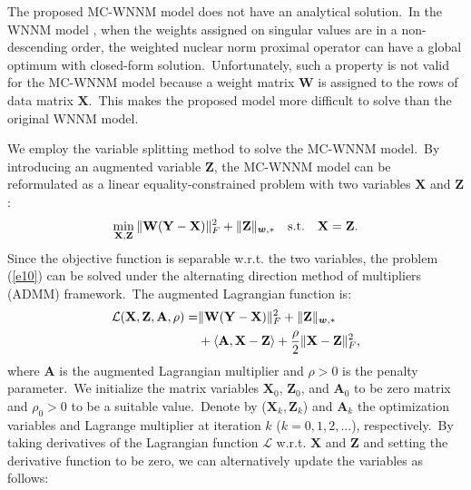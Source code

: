\documentclass[10pt,twocolumn,letterpaper]{article}
\begin{document}
The proposed MC-WNNM model does not have an analytical solution.\ In the WNNM model \cite{wnnmijcv}, when the weights assigned on singular values are in a non-descending order, the weighted nuclear norm proximal operator can have a global optimum with closed-form solution.\ Unfortunately, such a property is not valid for the MC-WNNM model because a weight matrix $\mathbf{W}$ is assigned to the rows of data matrix $\mathbf{X}$.\ This makes the proposed model more difficult to solve than the original WNNM model.

We employ the variable splitting method \cite{courant1943,Eckstein1992} to solve the MC-WNNM model.\ By introducing an augmented variable $\mathbf{Z}$, the MC-WNNM model can be reformulated as a linear equality-constrained problem with two variables $\mathbf{X}$ and $\mathbf{Z}$:
\vspace{-3mm}
\begin{equation}
\label{e10}
\vspace{-3mm}
\min_{\mathbf{X},\mathbf{Z}}\|\mathbf{W}(\mathbf{Y}-\mathbf{X})\|_{F}^{2}
+
\|\mathbf{Z}\|_{\bm{w},*}
\quad
\text{s.t.}
\quad
\mathbf{X}=\mathbf{Z}.
\end{equation}
Since the objective function is separable w.r.t. the two variables, the problem (\ref{e10}) can be solved under the alternating direction method of multipliers (ADMM) \cite{admm} framework.\ The augmented Lagrangian function is:
\vspace{-2mm}
\begin{equation}
\label{e11}
\vspace{-3mm}
\begin{split}
\mathcal{L}(\mathbf{X},\mathbf{Z},\mathbf{A},\rho)
=
&\|\mathbf{W}(\mathbf{Y}-\mathbf{X})\|_{F}^{2}
+
\|\mathbf{Z}\|_{\bm{w},*}
\\
&
+
\langle
\mathbf{A},\mathbf{X}-\mathbf{Z}
\rangle
+
\frac{\rho}{2}
\|\mathbf{X}-\mathbf{Z}\|_{F}^{2},
\end{split}
\end{equation}
where $\mathbf{A}$ is the augmented Lagrangian multiplier and $\rho>0$ is the penalty parameter.\ We initialize the matrix variables $\mathbf{X}_{0}$, $\mathbf{Z}_{0}$, and $\mathbf{A}_{0}$ to be zero matrix and $\rho_{0}>0$ to be a suitable value.\ Denote by ($\mathbf{X}_{k}, \mathbf{Z}_{k}$) and $\mathbf{A}_{k}$ the optimization variables and Lagrange multiplier at iteration $k$ ($k=0,1,2,...$), respectively.\ By taking derivatives of the Lagrangian function $\mathcal{L}$ w.r.t. $\mathbf{X}$ and $\mathbf{Z}$ and setting the derivative function to be zero, we can alternatively update the variables as follows:
\end{document}
